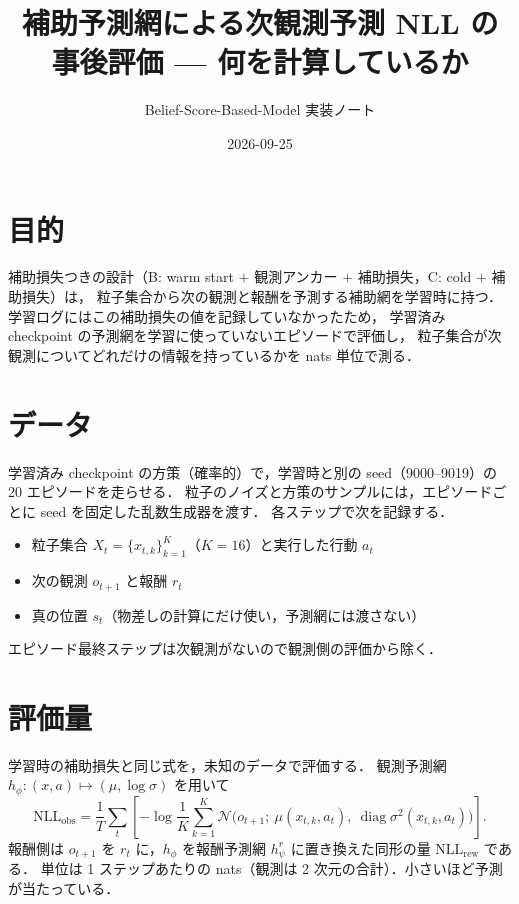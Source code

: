 \documentclass[a4paper,11pt]{article}
\title{補助予測網による次観測予測 NLL の事後評価 --- 何を計算しているか}
\author{Belief-Score-Based-Model 実装ノート}
\date{2026-09-25}
\begin{document}
\maketitle

\section{目的}

補助損失つきの設計（B: warm start $+$ 観測アンカー $+$ 補助損失，C: cold $+$ 補助損失）は，
粒子集合から次の観測と報酬を予測する補助網を学習時に持つ．
学習ログにはこの補助損失の値を記録していなかったため，
学習済み checkpoint の予測網を学習に使っていないエピソードで評価し，
粒子集合が次観測についてどれだけの情報を持っているかを nats 単位で測る．

\section{データ}

学習済み checkpoint の方策（確率的）で，学習時と別の seed（9000--9019）の 20 エピソードを走らせる．
粒子のノイズと方策のサンプルには，エピソードごとに seed を固定した乱数生成器を渡す．
各ステップで次を記録する．
\begin{itemize}
  \item 粒子集合 $X_t=\{x_{t,k}\}_{k=1}^{K}$（$K=16$）と実行した行動 $a_t$
  \item 次の観測 $o_{t+1}$ と報酬 $r_t$
  \item 真の位置 $s_t$（物差しの計算にだけ使い，予測網には渡さない）
\end{itemize}
エピソード最終ステップは次観測がないので観測側の評価から除く．

\section{評価量}

学習時の補助損失と同じ式を，未知のデータで評価する．
観測予測網 $h_\phi:(x,a)\mapsto(\mu,\log\sigma)$ を用いて
\begin{equation}
  \mathrm{NLL}_{\mathrm{obs}}
  = \frac{1}{T}\sum_{t}\left[
    -\log \frac{1}{K}\sum_{k=1}^{K}
    \mathcal{N}\!\bigl(o_{t+1};\ \mu(x_{t,k},a_t),\ \operatorname{diag}\sigma^{2}(x_{t,k},a_t)\bigr)
  \right].
  \label{eq:nllobs}
\end{equation}
報酬側は $o_{t+1}$ を $r_t$ に，$h_\phi$ を報酬予測網 $h^{r}_\psi$ に置き換えた同形の量 $\mathrm{NLL}_{\mathrm{rew}}$ である．
単位は 1 ステップあたりの nats（観測は 2 次元の合計）．小さいほど予測が当たっている．
\end{document}
